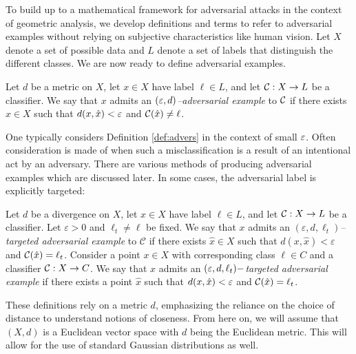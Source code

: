 To build up to a mathematical framework for adversarial attacks in the
context of geometric analysis, we develop definitions and terms to
refer to adversarial examples without relying on subjective
characteristics like human vision. Let $X$ denote a set of possible
data and $L$ denote a set of labels that distinguish the different
classes. We are now ready to define adversarial examples.

\begin{definition} \label{def:advers}
Let $d$ be a metric on $X$, let $x\in X$ have label $\ell\in L$, and
let $\mathcal{C}:X\to L$ be a classifier.
We say that $x$ admits an \emph{$(\varepsilon,d)$--adversarial example} to $\mathcal{C}$ if there exists $\hat x \in X$ such that $d(x,\hat x) < \varepsilon$ and $\mathcal{C}(\hat x) \neq \ell$.
\end{definition}

One typically considers Definition \ref{def:advers} in the context of small $\varepsilon$. 
Often consideration is made of when such a misclassification is a result of an intentional act by an adversary. 
There are various methods of producing adversarial examples which are discussed later. In some cases, the adversarial label is explicitly targeted:
\begin{definition}
Let $d$ be a divergence on $X$, let $x\in X$ have label $\ell\in L$, and let $\mathcal{C}:X\to L$ be a classifier.  Let $\varepsilon>0$ and $\ell_t\neq \ell$ be fixed. We say that $x$ admits an \emph{$(\varepsilon,d,\ell_t)$--targeted adversarial example} to $\mathcal{C}$ if there exists $\hat{x}\in X$ such that $d(x,\hat{x})<\varepsilon$ and $\mathcal{C}(\hat{x})=\ell_t$.
Consider a point $x \in X$ with corresponding class $\ell \in C$ and a classifier $\mathcal{C}: X \to C$. We say that $x$ admits an \emph{$(\varepsilon,d,\ell_t)-$targeted adversarial example}  if there exists a point $\hat x$ such that $d(x,\hat x) < \varepsilon$ and $\mathcal{C}(\hat x) = \ell_t$. 
\end{definition}

These definitions rely on a metric $d$, emphasizing the reliance on the choice of distance to understand notions of closeness. From here on, we will assume that $(X,d)$ is a Euclidean vector space with $d$ being the Euclidean metric. This will allow for the use of standard Gaussian distributions as well.%


